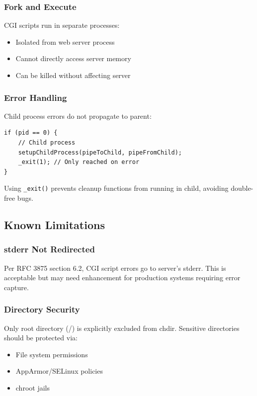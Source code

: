 \documentclass[11pt,a4paper]{article}
\begin{document}
\subsubsection{Fork and Execute}

CGI scripts run in separate processes:
\begin{itemize}
    \item Isolated from web server process
    \item Cannot directly access server memory
    \item Can be killed without affecting server
\end{itemize}

\subsubsection{Error Handling}

Child process errors do not propagate to parent:
\begin{lstlisting}[caption=Child Process Error Handling]
if (pid == 0) {
    // Child process
    setupChildProcess(pipeToChild, pipeFromChild);
    _exit(1); // Only reached on error
}
\end{lstlisting}

Using \texttt{\_exit()} prevents cleanup functions from running in child, avoiding double-free bugs.

\subsection{Known Limitations}

\subsubsection{stderr Not Redirected}

Per RFC 3875 section 6.2, CGI script errors go to server's stderr. This is acceptable but may need enhancement for production systems requiring error capture.

\subsubsection{Directory Security}

Only root directory (/) is explicitly excluded from chdir. Sensitive directories should be protected via:
\begin{itemize}
    \item File system permissions
    \item AppArmor/SELinux policies
    \item chroot jails
\end{itemize}
\end{document}
